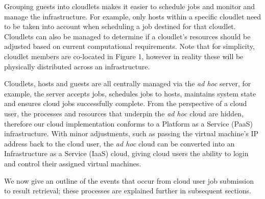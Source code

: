 \documentclass[10pt, conference, compsocconf]{IEEEtran}
\begin{document}
Grouping guests into cloudlets makes it easier to schedule jobs and monitor and manage the infrastructure. For example, only hosts within a specific cloudlet need to be taken into account when scheduling a job destined for that cloudlet. Cloudlets can also be managed to determine if a cloudlet's resources should be adjusted based on current computational requirements. Note that for simplicity, cloudlet members are co-located in Figure 1, however in reality these will be physically distributed across an infrastructure.

Cloudlets, hosts and guests are all centrally managed via the \textit{ad hoc} server, for example, the server accepts jobs, schedules jobs to hosts, maintains system state and ensures cloud jobs successfully complete. From the perspective of a cloud user, the processes and resources that underpin the \textit{ad hoc} cloud are hidden, therefore our cloud implementation conforms to a Platform as a Service (PaaS) infrastructure. With minor adjustments, such as passing the virtual machine's IP address back to the cloud user, the \textit{ad hoc} cloud can be converted into an Infrastructure as a Service (IaaS) cloud, giving cloud users the ability to login and control their assigned virtual machines. 

We now give an outline of the events that occur from cloud user job submission to result retrieval; these processes are explained further in subsequent sections.
\end{document}
